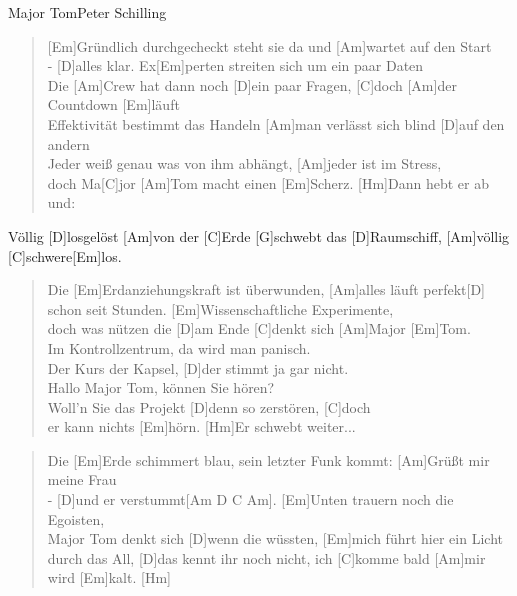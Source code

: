 \begin{song}{Major Tom}{Peter Schilling}

    \begin{verse}  
        [Em]Gründlich durchgecheckt steht sie da und [Am]wartet auf den Start \\
         - [D]alles klar. Ex[Em]perten streiten sich um ein paar Daten \\
        Die [Am]Crew hat dann noch [D]ein paar Fragen, [C]doch [Am]der Countdown [Em]läuft \\
        [Em]Effektivität bestimmt das Handeln [Am]man verlässt sich blind [D]auf den andern \\
        [Em]Jeder weiß genau was von ihm abhängt, [Am]jeder ist im Stress, \\
        [D]doch Ma[C]jor [Am]Tom macht einen [Em]Scherz. [Hm]Dann hebt er ab und: 
    \end{verse}  

    \begin{chorus}
        [G]Völlig [D]losgelöst [Am]von der [C]Erde [G]schwebt das [D]Raumschiff, [Am]völlig [C]schwere[Em]los.
    \end{chorus}

    \begin{verse}  
        Die [Em]Erdanziehungskraft ist überwunden, [Am]alles läuft perfekt[D] \\
        schon seit Stunden. [Em]Wissenschaftliche Experimente, \\
        [Am]doch was nützen die [D]am Ende [C]denkt sich [Am]Major [Em]Tom. \\
        [Em]Im Kontrollzentrum, da wird man panisch. \\
        [Am]Der Kurs der Kapsel, [D]der stimmt ja gar nicht. \\
        [Em]Hallo Major Tom, können Sie hören? \\
        [Am]Woll'n Sie das Projekt [D]denn so zerstören, [C]doch \\
        [Am]er kann nichts [Em]hörn. [Hm]Er schwebt weiter...
    \end{verse}  


    \begin{verse}  
        Die [Em]Erde schimmert blau, sein letzter Funk kommt: [Am]Grüßt mir meine Frau \\
        - [D]und er verstummt[Am D C Am]. \hspace{5em}[Em]Unten trauern noch die Egoisten, \\
        [Am]Major Tom denkt sich [D]wenn die wüssten, [Em]mich führt hier ein Licht \\
        durch das All, [D]das kennt ihr noch nicht, ich [C]komme bald [Am]mir wird [Em]kalt. [Hm]
    \end{verse}  


\end{song}
